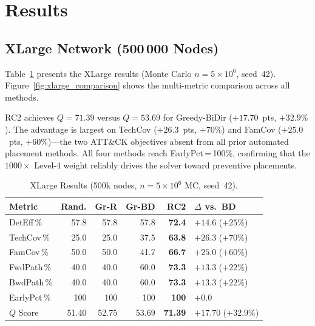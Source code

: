 \documentclass[journal]{IEEEtran}
\begin{document}
\section{Results}
\label{sec:results}

\subsection{XLarge Network (500\,000 Nodes)}
\label{sec:results:xlarge}

Table~\ref{tab:xlarge} presents the XLarge results (Monte Carlo
$n=5\times10^6$, seed~42). Figure~\ref{fig:xlarge_comparison} shows
the multi-metric comparison across all methods.

RC2 achieves $Q=71.39$ versus $Q=53.69$ for Greedy-BiDir
($+17.70$~pts, $+32.9\%$). The advantage is largest on TechCov
($+26.3$~pts, $+70\%$) and FamCov ($+25.0$~pts, $+60\%$)---the two
ATT\&CK objectives absent from all prior automated placement methods.
All four methods reach EarlyPct\,=\,100\%, confirming that the
$1000\times$ Level-4 weight reliably drives the solver toward
preventive placements.

\begin{table}[t]
\caption{XLarge Results (500k nodes, $n=5{\times}10^6$ MC, seed~42).}
\label{tab:xlarge}
\centering
\renewcommand{\arraystretch}{1.2}
\begin{tabular}{lrrrrl}
\toprule
Metric & Rand. & Gr-R & Gr-BD & \textbf{RC2} & $\Delta$ vs.\ BD \\
\midrule
DetEff\,\%  & 57.8 & 57.8 & 57.8 & \textbf{72.4} & $+14.6$ ($+25\%$) \\
TechCov\,\% & 25.0 & 25.0 & 37.5 & \textbf{63.8} & $+26.3$ ($+70\%$) \\
FamCov\,\%  & 50.0 & 50.0 & 41.7 & \textbf{66.7} & $+25.0$ ($+60\%$) \\
FwdPath\,\% & 40.0 & 40.0 & 60.0 & \textbf{73.3} & $+13.3$ ($+22\%$) \\
BwdPath\,\% & 40.0 & 40.0 & 60.0 & \textbf{73.3} & $+13.3$ ($+22\%$) \\
EarlyPct\,\%& 100  & 100  & 100  & \textbf{100}  & $+0.0$ \\
\midrule
$Q$ Score & 51.40 & 52.75 & 53.69 & \textbf{71.39} & $+17.70$ ($+32.9\%$)\\
\bottomrule
\end{tabular}
\end{table}
\end{document}
